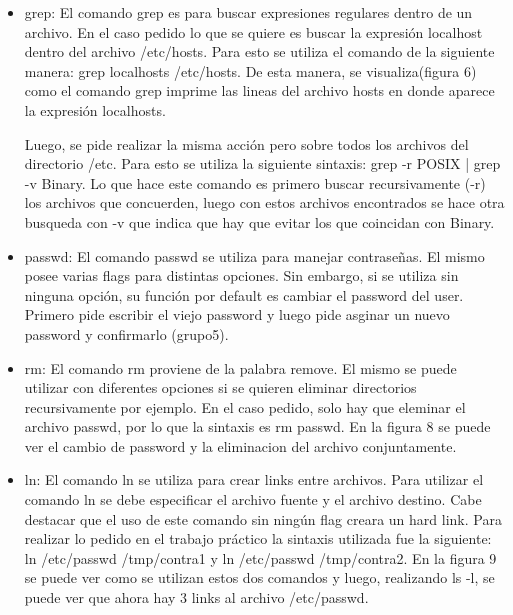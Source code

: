 \documentclass[a4paper, 12pt]{article}
\begin{document}
\begin{itemize}
Cabe destacar que el comando chmod se utiliz\'o varias veces para ir cambiando de a poco los permisos seg\'un sean para el usuario, para el grupo o para los otros. Sin embargo, esto se puede realizar utilizando una sola vez el comando chmod. La sintaxis para el mismo ser\'ia chmod 751 passwd. El numero 751 esta es una manera de codificar los permisos, el 7(111) corresponde al user y esta poniendo en 1 los 3 permisos; el 5(101) es para el grupo, dado un orden predispuesto, lo que hace esto es setear en 1 los permisos de Read y eXecute, que son el primero y el tercero respectivamente, y setea en 0 el segundo permiso(Write). Por \'ultimo, el 1(001) corresponde a setear el permiso de eXecute para los Others.

\item grep: El comando grep es para buscar expresiones regulares dentro de un archivo. En el caso pedido lo que se quiere es buscar la expresi\'on localhost dentro del archivo /etc/hosts. Para esto se utiliza el comando de la siguiente manera: grep localhosts /etc/hosts. De esta manera, se visualiza(figura 6) como el comando grep imprime las lineas del archivo hosts en donde aparece la expresi\'on localhosts.

Luego, se pide realizar la misma acci\'on pero sobre todos los archivos del directorio /etc.
Para esto se utiliza la siguiente sintaxis: grep -r POSIX | grep -v Binary. Lo que hace este comando es primero buscar recursivamente (-r) los archivos que concuerden, luego con estos archivos encontrados se hace otra busqueda con -v que indica que hay que evitar los que coincidan con Binary.

\item passwd: El comando passwd se utiliza para manejar contrase\~{n}as. El mismo posee varias flags para distintas opciones. Sin embargo, si se utiliza sin ninguna opci\'on, su funci\'on por default es cambiar el password del user. Primero pide escribir el viejo password y luego pide asginar un nuevo password y confirmarlo (grupo5).

\item rm: El comando rm proviene de la palabra remove. El mismo se puede utilizar con diferentes opciones si se quieren eliminar directorios recursivamente por ejemplo. En el caso pedido, solo hay que eleminar el archivo passwd, por lo que la sintaxis es rm passwd. En la figura 8 se puede ver el cambio de password y la eliminacion del archivo conjuntamente.

\item ln: El comando ln se utiliza para crear links entre archivos. Para utilizar el comando ln se debe especificar el archivo fuente y el archivo destino. Cabe destacar que el uso de este comando sin ning\'un flag creara un hard link. Para realizar lo pedido en el trabajo pr\'actico la sintaxis utilizada fue la siguiente: ln /etc/passwd /tmp/contra1 y ln /etc/passwd /tmp/contra2. En la figura 9 se puede ver como se utilizan estos dos comandos y luego, realizando ls -l, se puede ver que ahora hay 3 links al archivo /etc/passwd.


\end{itemize}
\end{document}
